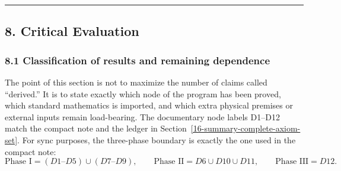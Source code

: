 \begin{center}\rule{0.5\linewidth}{0.5pt}\end{center}

\subsection{8. Critical Evaluation}\label{8-critical-evaluation}

\subsubsection{8.1 Classification of results and remaining dependence}\label{81-classification-of-results}

The point of this section is not to maximize the number of claims called ``derived.'' It is to state exactly which node of the program has been proved, which standard mathematics is imported, and which extra physical premises or external inputs remain load-bearing. The documentary node labels D1--D12 match the compact note and the ledger in Section~\ref{16-summary-complete-axiom-set}. For sync purposes, the three-phase boundary is exactly the one used in the compact note:
\[
\text{Phase I}=(D1\text{--}D5)\cup(D7\text{--}D9),\qquad
\text{Phase II}=D6\cup D10\cup D11,\qquad
\text{Phase III}=D12.
\]

